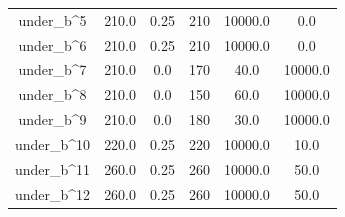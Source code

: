 \documentclass[a4paper,11pt]{article}
\begin{document}
\begin{longtable}{cccccc}
under\_b\textasciicircum{}5 & 210.0 & 0.25 & 210 & 10000.0 & 0.0\\
under\_b\textasciicircum{}6 & 210.0 & 0.25 & 210 & 10000.0 & 0.0\\
\addlinespace
under\_b\textasciicircum{}7 & 210.0 & 0.0 & 170 & 40.0 & 10000.0\\
under\_b\textasciicircum{}8 & 210.0 & 0.0 & 150 & 60.0 & 10000.0\\
under\_b\textasciicircum{}9 & 210.0 & 0.0 & 180 & 30.0 & 10000.0\\
under\_b\textasciicircum{}10 & 220.0 & 0.25 & 220 & 10000.0 & 10.0\\
under\_b\textasciicircum{}11 & 260.0 & 0.25 & 260 & 10000.0 & 50.0\\
\addlinespace
under\_b\textasciicircum{}12 & 260.0 & 0.25 & 260 & 10000.0 & 50.0\\*
\end{longtable}
\endgroup{}
\end{document}
